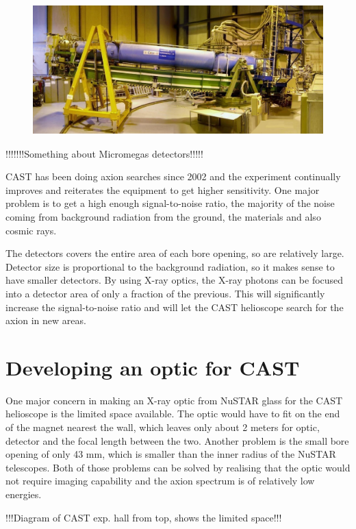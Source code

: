 \begin{figure}[htbp]
  \centering
    \includegraphics[height=5cm]{figures/cast/cast_instrument.jpg}
  \caption{}
  \label{fig:cast_instrument}
\end{figure}

!!!!!!!Something about Micromegas detectors!!!!!

CAST has been doing axion searches since 2002 and the experiment continually improves and reiterates the equipment to get higher sensitivity. One major problem is to get a high enough signal-to-noise ratio, the majority of the noise coming from background radiation from the ground, the materials and also cosmic rays.

The detectors covers the entire area of each bore opening, so are relatively large. Detector size is proportional to the background radiation, so it makes sense to have smaller detectors. By using X-ray optics, the X-ray photons can be focused into a detector area of only a fraction of the previous. This will significantly increase the signal-to-noise ratio and will let the CAST helioscope search for the axion in new areas.

\section{Developing an optic for CAST}
One major concern in making an X-ray optic from NuSTAR glass for the CAST helioscope is the limited space available. The optic would have to fit on the end of the magnet nearest the wall, which leaves only about 2 meters for optic, detector and the focal length between the two. Another problem is the small bore opening of only 43 mm, which is smaller than the inner radius of the NuSTAR telescopes. Both of those problems can be solved by realising that the optic would not require imaging capability and the axion spectrum is of relatively low energies.

!!!Diagram of CAST exp. hall from top, shows the limited space!!!

